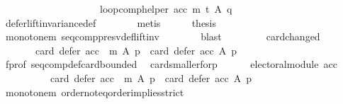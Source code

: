 \begin{isabellebody}
\ \ \ \ \ \ \ \ \ \ \ \ \ \ \ \ \ \ \ \ {\isacharparenleft}{\kern0pt}loop{\isacharunderscore}{\kern0pt}comp{\isacharunderscore}{\kern0pt}helper\ acc\ m\ t{\isacharparenright}{\kern0pt}\ A\ q{\isacharparenright}{\kern0pt}{\isachardoublequoteclose}\isanewline
\ \ \ \ \ \ \isamarkupfalse%
\ defer{\isacharunderscore}{\kern0pt}lift{\isacharunderscore}{\kern0pt}invariance{\isacharunderscore}{\kern0pt}def\isanewline
\ \ \ \ \ \ \isamarkupfalse%
\ metis\isanewline
\ \ \ \ \isamarkupfalse%
\ {\isacharquery}{\kern0pt}thesis\isanewline
\ \ \ \ \ \ \isamarkupfalse%
\ monotone{\isacharunderscore}{\kern0pt}m\ seq{\isacharunderscore}{\kern0pt}comp{\isacharunderscore}{\kern0pt}presv{\isacharunderscore}{\kern0pt}def{\isacharunderscore}{\kern0pt}lift{\isacharunderscore}{\kern0pt}inv\isanewline
\ \ \ \ \ \ \isamarkupfalse%
\ blast\isanewline
\ \ \isamarkupfalse%
\isanewline
\ \ \ \ \isamarkupfalse%
\ card{\isacharunderscore}{\kern0pt}changed{\isacharcolon}{\kern0pt}\isanewline
\ \ \ \ \ \ {\isachardoublequoteopen}{\isasymnot}\ {\isacharparenleft}{\kern0pt}card\ {\isacharparenleft}{\kern0pt}defer\ {\isacharparenleft}{\kern0pt}acc\ {\isasymtriangleright}\ m{\isacharparenright}{\kern0pt}\ A\ p{\isacharparenright}{\kern0pt}\ {\isacharequal}{\kern0pt}\ card\ {\isacharparenleft}{\kern0pt}defer\ acc\ A\ p{\isacharparenright}{\kern0pt}{\isacharparenright}{\kern0pt}{\isachardoublequoteclose}\isanewline
\ \ \ \ \isamarkupfalse%
\ f{\isacharunderscore}{\kern0pt}prof\ seq{\isacharunderscore}{\kern0pt}comp{\isacharunderscore}{\kern0pt}def{\isacharunderscore}{\kern0pt}card{\isacharunderscore}{\kern0pt}bounded\ \isamarkupfalse%
\ card{\isacharunderscore}{\kern0pt}smaller{\isacharunderscore}{\kern0pt}for{\isacharunderscore}{\kern0pt}p{\isacharcolon}{\kern0pt}\isanewline
\ \ \ \ \ \ {\isachardoublequoteopen}electoral{\isacharunderscore}{\kern0pt}module\ {\isacharparenleft}{\kern0pt}acc{\isacharparenright}{\kern0pt}\ {\isasymlongrightarrow}\isanewline
\ \ \ \ \ \ \ \ \ \ {\isacharparenleft}{\kern0pt}card\ {\isacharparenleft}{\kern0pt}defer\ {\isacharparenleft}{\kern0pt}acc\ {\isasymtriangleright}\ m{\isacharparenright}{\kern0pt}\ A\ p{\isacharparenright}{\kern0pt}\ {\isacharless}{\kern0pt}\ card\ {\isacharparenleft}{\kern0pt}defer\ acc\ A\ p{\isacharparenright}{\kern0pt}{\isacharparenright}{\kern0pt}{\isachardoublequoteclose}\isanewline
\ \ \ \ \ \ \isamarkupfalse%
\ monotone{\isacharunderscore}{\kern0pt}m\ order{\isachardot}{\kern0pt}not{\isacharunderscore}{\kern0pt}eq{\isacharunderscore}{\kern0pt}order{\isacharunderscore}{\kern0pt}implies{\isacharunderscore}{\kern0pt}strict\isanewline

\end{isabellebody}
